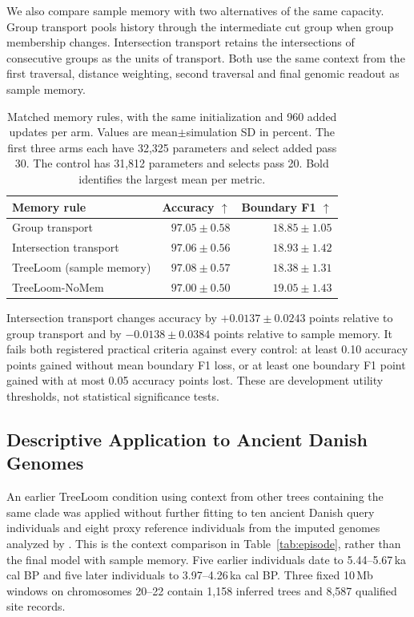 \documentclass[letterpaper]{article}
\newcommand{\best}[1]{\mathbf{#1}}
\begin{document}
We also compare sample memory with two alternatives of the same capacity. Group transport pools history through the intermediate cut group when group membership changes. Intersection transport retains the intersections of consecutive groups as the units of transport. Both use the same context from the first traversal, distance weighting, second traversal and final genomic readout as sample memory.

\begin{table}[t]
\centering
\small
\begin{tabular}{@{}lrr@{}}
\toprule
Memory rule & Accuracy $\uparrow$ & Boundary F1 $\uparrow$\\
\midrule
Group transport &$97.05\pm0.58$&$18.85\pm1.05$\\
Intersection transport &$97.06\pm0.56$&$18.93\pm1.42$\\
TreeLoom (sample memory) &$\best{97.08\pm0.57}$&$18.38\pm1.31$\\
TreeLoom-NoMem &$97.00\pm0.50$&$\best{19.05\pm1.43}$\\
\bottomrule
\end{tabular}
\caption{Matched memory rules, with the same initialization and 960 added updates per arm. Values are mean$\pm$simulation SD in percent. The first three arms each have 32,325 parameters and select added pass 30. The control has 31,812 parameters and selects pass 20. Bold identifies the largest mean per metric.}
\label{tab:memoryrules}
\end{table}

Intersection transport changes accuracy by $+0.0137\pm0.0243$ points relative to group transport and by $-0.0138\pm0.0384$ points relative to sample memory. It fails both registered practical criteria against every control: at least 0.10 accuracy points gained without mean boundary F1 loss, or at least one boundary F1 point gained with at most 0.05 accuracy points lost. These are development utility thresholds, not statistical significance tests.

\subsection{Descriptive Application to Ancient Danish Genomes}
An earlier TreeLoom condition using context from other trees containing the same clade was applied without further fitting to ten ancient Danish query individuals and eight proxy reference individuals from the imputed genomes analyzed by \citet{eurasians2024}. This is the context comparison in Table~\ref{tab:episode}, rather than the final model with sample memory. Five earlier individuals date to 5.44--5.67\,ka cal BP and five later individuals to 3.97--4.26\,ka cal BP. Three fixed 10\,Mb windows on chromosomes 20--22 contain 1,158 inferred trees and 8,587 qualified site records.
\end{document}
